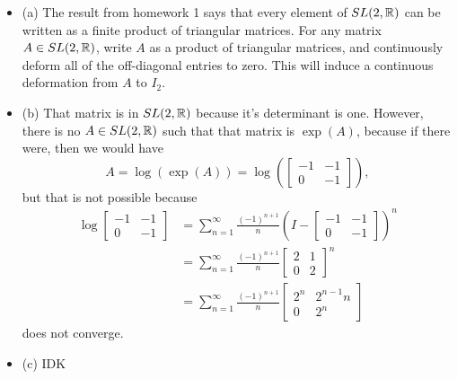 \documentclass{article}
\begin{document}
\begin{itemize}
    \item (a) The result from homework 1 says that every element of $SL(2,\mathbb{R})$ can be written as a finite product of triangular matrices. For any matrix $A \in SL(2,\mathbb{R})$, write $A$ as a product of triangular matrices, and continuously deform all of the off-diagonal entries to zero. This will induce a continuous deformation from $A$ to $I_2$.
    \item (b) That matrix is in $SL(2,\mathbb{R})$ because it's determinant is one. However, there is no $A \in SL(2,\mathbb{R})$ such that that matrix is $\exp(A)$, because if there were, then we would have
        \[ A = \log(\exp(A)) = \log \left( \begin{bmatrix}
            -1 & -1 \\
            0 & -1
    \end{bmatrix} \right), \]
        but that is not possible because
        \begin{align*}
            \log \begin{bmatrix}
                -1 & -1 \\
                0 & -1
                \end{bmatrix} &= \sum_{n=1}^\infty \frac{(-1)^{n+1}}{n} \left( I - \begin{bmatrix}
                -1 & -1 \\
                0 & -1
            \end{bmatrix} \right)^n \\
            &= \sum_{n=1}^\infty \frac{(-1)^{n+1}}{n} \begin{bmatrix}
                2 & 1 \\
                0 & 2
            \end{bmatrix}^n \\
            &= \sum_{n=1}^\infty \frac{(-1)^{n+1}}{n} \begin{bmatrix}
                2^n & 2^{n-1}n \\
                0 & 2^n
            \end{bmatrix}
        \end{align*}
        does not converge.
    \item (c) IDK
\end{itemize}
\end{document}
